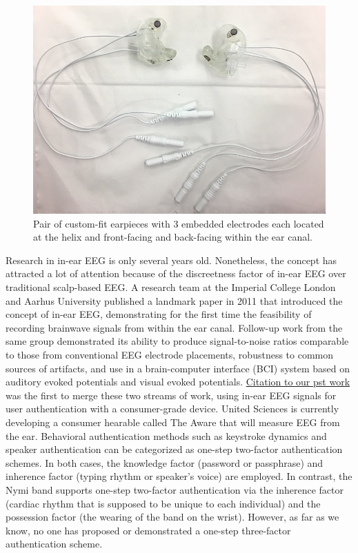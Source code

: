 \documentclass[11pt]{article}
\begin{document}
\begin{figure}[htbp]
\centering
\includegraphics[width=.9\linewidth]{./figures/2EEEG.jpg}
\caption{Pair of custom-fit earpieces with 3 embedded electrodes each located at the helix and front-facing and back-facing within the ear canal.}
\end{figure}

Research in in-ear EEG is only several years old. Nonetheless, the concept has
attracted a lot of attention because of the discreetness factor of in-ear EEG over
traditional scalp-based EEG. A research team at the Imperial College London
and Aarhus University published a landmark paper in 2011 that introduced the
concept of in-ear EEG, demonstrating for the first time the feasibility of recording
brainwave signals from within the ear canal. Follow-up work from the same
group demonstrated its ability to produce signal-to-noise ratios comparable to
those from conventional EEG electrode placements, robustness to common
sources of artifacts, and use in a brain-computer interface (BCI) system based on
auditory evoked potentials and visual evoked potentials.
\uline{Citation to our pst work} 
was the first to merge these two streams of work, using in-ear EEG signals for
user authentication with a consumer-grade device. United Sciences is currently
developing a consumer hearable called The Aware that will measure EEG from the ear.
Behavioral authentication methods such as keystroke dynamics and speaker
authentication can be categorized as one-step two-factor authentication
schemes. In both cases, the knowledge factor (password or passphrase) and
inherence factor (typing rhythm or speaker’s voice) are employed. In contrast, the
Nymi band supports one-step two-factor authentication via the inherence
factor (cardiac rhythm that is supposed to be unique to each individual) and the
possession factor (the wearing of the band on the wrist). However, as far as we
know, no one has proposed or demonstrated a one-step three-factor
authentication scheme.
\end{document}
